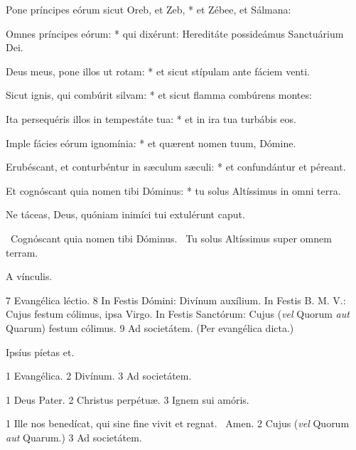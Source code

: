 Pone príncipes eórum sicut Oreb, et Zeb, * et Zébee, et Sálmana:

Omnes príncipes eórum: * qui dixérunt: Hereditáte possideámus Sanctuárium Dei.

Deus meus, pone illos ut rotam: * et sicut stípulam ante fáciem venti.

Sicut ignis, qui combúrit silvam: * et sicut flamma combúrens montes:

Ita persequéris illos in tempestáte tua: * et in ira tua turbábis eos.

Imple fácies eórum ignomínia: * et quærent nomen tuum, Dómine.

Erubéscant, et conturbéntur in sæculum sæculi: * et confundántur et péreant.

Et cognóscant quia nomen tibi Dóminus: * tu solus Altíssimus in omni terra.

 Ne táceas, Deus, quóniam inimíci tui extulérunt caput.


\V\ Cognóscant quia nomen tibi Dóminus. \R\ Tu solus Altíssimus super omnem terram.


 A vínculis.

 7 Evangélica léctio. 8 In Festis Dómini: Divínum auxílium. In Festis B. M. V.: Cujus festum cólimus, ipsa Virgo. In Festis Sanctórum: Cujus (\textit{vel} Quorum \textit{aut} Quarum) festum cólimus. 9 Ad societátem. (Per evangélica dicta.)


 Ipsíus píetas et.


 1 Evangélica. 2 Divínum. 3 Ad societátem.


 1 Deus Pater. 2 Christus perpétuæ. 3 Ignem sui amóris.


 1 Ille nos benedícat, qui sine fine vivit et regnat. \R\ Amen. 2 Cujus (\textit{vel} Quorum \textit{aut} Quarum.) 3 Ad societátem.

